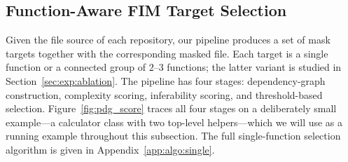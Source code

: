 \subsection{Function-Aware FIM Target Selection}
\label{sec:method:selection}

Given the file source of each repository, our pipeline produces a set of
mask targets together with the corresponding masked file. Each target is
a single function or a connected group of $2$--$3$ functions; the latter
variant is studied in Section~\ref{sec:exp:ablation}. The pipeline has
four stages: dependency-graph construction, complexity scoring,
inferability scoring, and threshold-based selection.
Figure~\ref{fig:pdg_score} traces all four stages on a deliberately
small example---a calculator class with two top-level helpers---which we
will use as a running example throughout this subsection. The full
single-function selection algorithm is given in
Appendix~\ref{app:algo:single}.


